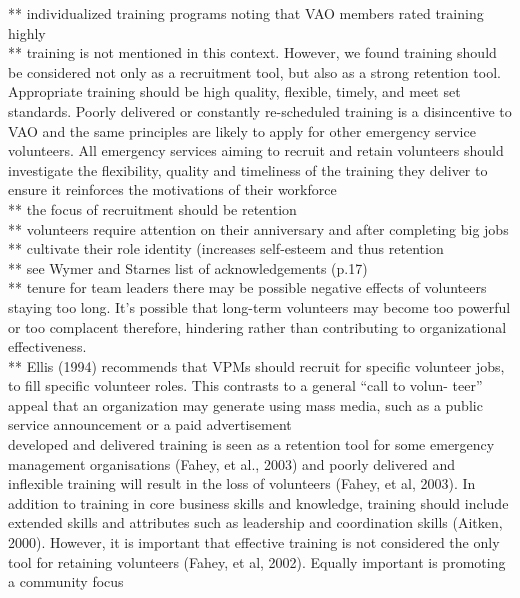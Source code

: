 \documentclass[11pt,fleqn]{book} %
\begin{document}
** individualized training programs noting that VAO members rated training highly\\
** training is not mentioned in this context.
However, we found training should be considered not
only as a recruitment tool, but also as a strong retention
tool. Appropriate training should be high quality, flexible,
timely, and meet set standards. Poorly delivered or
constantly re-scheduled training is a disincentive to
VAO and the same principles are likely to apply for
other emergency service volunteers. All emergency
services aiming to recruit and retain volunteers should
investigate the flexibility, quality and timeliness of
the training they deliver to ensure it reinforces the
motivations of their workforce\\
** the focus of recruitment should be retention\\
** volunteers require attention on their anniversary and after completing big jobs\\
** cultivate their role identity (increases self-esteem and thus retention\\

** see Wymer and Starnes list of acknowledgements (p.17)\\
** tenure for team leaders there may be possible negative effects of volunteers
staying too long. It’s possible that long-term volunteers may become too powerful or too complacent therefore, hindering rather than contributing to organizational effectiveness.\\

** Ellis (1994) recommends that VPMs should recruit for specific volunteer
jobs, to fill specific volunteer roles. This contrasts to a general “call to volun-
teer” appeal that an organization may generate using mass media, such as a
public service announcement or a paid advertisement \autocite{wymer_jr._conceptual_2001}\\



\autocite{ranse_engaging_2010}
developed and delivered training is seen as a retention
tool for some emergency management organisations
(Fahey, et al., 2003) and poorly delivered and inflexible
training will result in the loss of volunteers (Fahey, et al,
2003). In addition to training in core business skills and
knowledge, training should include extended skills and
attributes such as leadership and coordination skills
(Aitken, 2000). However, it is important that effective
training is not considered the only tool for retaining
volunteers (Fahey, et al, 2002). Equally important is
promoting a community focus
\end{document}
